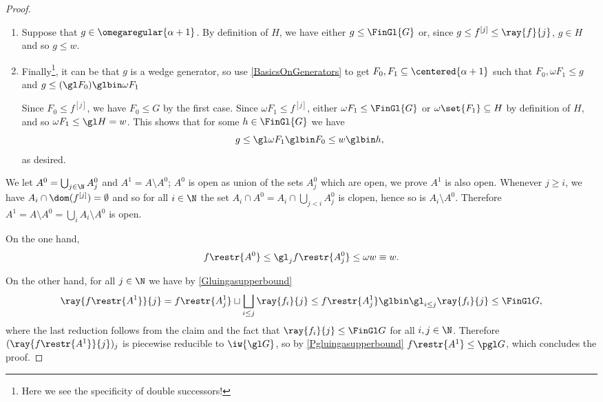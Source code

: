 \begin{proof}
\begin{subproof}
\begin{enumerate}
\item Suppose that $g\in\omegaregular{\alpha+1}$. By definition of $H$, we have either $g\leq\FinGl{G}$ or, since $g\leq f^{[j]}\leq \ray{f}{j}$, $g\in H$ and so $g\leq w$.

\item Finally\footnote{Here we see the specificity of double successors!},
it can be that $g$ is a wedge generator, so use \cref{BasicsOnGenerators} to get $F_0,F_1\subseteq \centered{\alpha+1}$ such that $F_0,\omega F_1\leq g$ and $g\leq(\gl F_0)\glbin \omega F_1$

Since $F_0\leq f^{[j]}$, we have $F_0\leq G$ by the first case.
Since $\omega F_1\leq f^{[j]}$, either $\omega F_1 \leq\FinGl{G}$ or $\omega\set{F_1}\subseteq H$ by definition of $H$, and so $\omega F_1\leq \gl H= w$.
This shows that for some $h\in \FinGl{G}$ we have
\[
g\leq\gl \omega F_1 \glbin F_0  \leq w \glbin h, 
\]
as desired.\qedhere
\end{enumerate}
\end{subproof}


We let $A^0=\bigcup_{j\in\N} A^0_j$ and $A^1=A\setminus A^0$;
$A^0$ is open as union of the sets $A^0_j$ which are open, we prove $A^1$ is also open. 
Whenever $j\geq i$, we have $A_i\cap \dom(f^{[j]})=\emptyset$ and so for all $i\in \N$ the set $A_i\cap A^0=A_i \cap \bigcup_{j<i}A^0_j$ is clopen, hence so is $A_i\setminus A^0$.
Therefore $A^1=A\setminus A^0=\bigcup_i A_i\setminus A^0$ is open.

On the one hand, 
\[
f\restr{A^0}\leq \gl_{j} f\restr{A^0_j} \leq \omega w \equiv w.
\] 

On the other hand, for all $j\in\N$ we have by \cref{Gluingasupperbound}
\[
\ray{f\restr{A^1}}{j}=f\restr{A^1_j} \sqcup  \bigsqcup_{i\leq j}\ray{f_i}{j}
\leq f\restr{A^1_j}\glbin \gl_{i\leq j} \ray{f_i}{j} \leq \FinGl G,
\]
where the last reduction follows from the claim and the fact that $\ray{f_i}{j}\leq \FinGl G$ for all $i,j\in\N$. Therefore $(\ray{f\restr{A^1}}{j})_j$ is piecewise reducible to $\iw{\gl G}$, so by \cref{Pgluingasupperbound} $f\restr{A^1}\leq\pgl G$, which concludes the proof. 
\end{proof}

